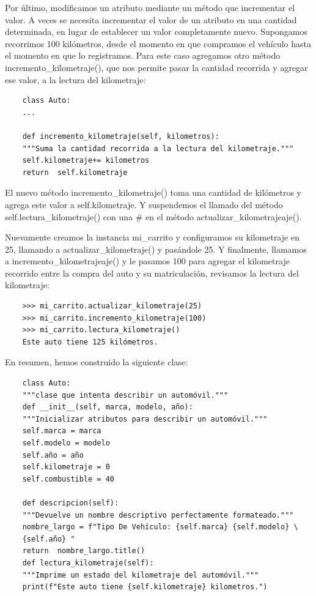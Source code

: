 {Por último, modificamos un atributo mediante un método que incrementar el valor. 
A veces se necesita incrementar el valor de un atributo en una cantidad determinada, en lugar de establecer un valor completamente nuevo. Supongamos recorrimos 100 kilómetros, desde el momento en que compramos el vehículo hasta el momento en que lo registramos.  Para este caso agregamos otro método {\ttfamily incremento\_kilometraje()}, que nos permite pasar la cantidad recorrida y agregar ese valor, a la lectura del kilometraje:

\begin{lstlisting}
	class Auto:
	...
	
	def incremento_kilometraje(self, kilometros):
	"""Suma la cantidad recorrida a la lectura del kilometraje."""
	self.kilometraje+= kilometros        
	return  self.kilometraje
\end{lstlisting}

El nuevo método {\ttfamily incremento\_kilometraje()} toma una cantidad de kilómetros y agrega este valor a {\ttfamily self.kilometraje}. Y suspendemos el llamado del método {\ttfamily self.lectura\_kilometraje()} con una {\ttfamily \#} en el método {\ttfamily actualizar\_kilometrajeaje()}.


Nuevamente creamos la instancia {\ttfamily mi\_carrito} y configuramos su kilometraje en 25, llamando a {\ttfamily actualizar\_kilometraje()} y pasándole 25. Y finalmente, llamamos a {\ttfamily incremento\_kilometrajeaje()} y le pasamos 100 para agregar el kilometraje  recorrido entre la compra del auto y su matriculación, revisamos la lectura del kilometraje:

\begin{lstlisting}
	>>> mi_carrito.actualizar_kilometraje(25)	
	>>> mi_carrito.incremento_kilometraje(100)
	>>> mi_carrito.lectura_kilometraje()
	Este auto tiene 125 kilómetros.
\end{lstlisting}



En resumen, hemos  construido la siguiente clase:


\begin{lstlisting}
	class Auto:
	"""clase que intenta describir un automóvil."""
	def __init__(self, marca, modelo, año):
	"""Inicializar atributos para describir un automóvil."""
	self.marca = marca
	self.modelo = modelo
	self.año = año
	self.kilometraje = 0
	self.combustible = 40
	
	def descripcion(self):
	"""Devuelve un nombre descriptivo perfectamente formateado."""
	nombre_largo = f"Tipo De Vehículo: {self.marca} {self.modelo} \
	{self.año} " 
	return  nombre_largo.title()
	def lectura_kilometraje(self):
	"""Imprime un estado del kilometraje del automóvil."""        
	print(f"Este auto tiene {self.kilometraje} kilometros.")
	

\end{lstlisting}}
